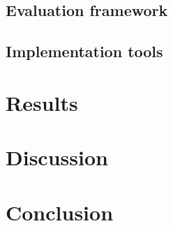 \documentclass[pdftex,10pt,a4paper,oneside]{article}
\numberwithin{equation}{section}
\begin{document}
\subsection*{Evaluation framework}

\subsection*{Implementation tools}

\newpage

\section{Results}\label{sec:4-results}
\newpage

\section{Discussion}\label{sec:5-discussion}
\newpage

\section{Conclusion}\label{sec:6-conclusion}
\newpage



\newpage


\end{document}
